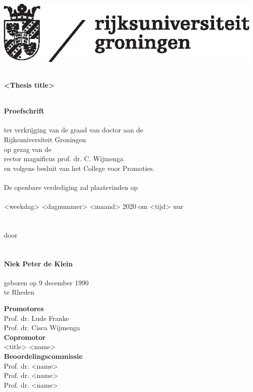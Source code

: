 \begin{flushleft}
\includegraphics[scale=0.8]{img/rugr_logonl_zwart_cmyk}
\end{flushleft}

\begin{center}
\linespread{1.00} %
~\\
\huge
\textbf{<Thesis title>}
\\~\\
\linespread{1.05} %


\large
\textbf{Proefschrift}
\\~\\
\normalsize
ter verkrijging van de graad van doctor aan de\\
Rijksuniversiteit Groningen\\
op gezag van de\\
rector magnificus prof. dr. C. Wijmenga\\
en volgens besluit van het College voor Promoties.
\\~\\
De openbare verdediging zal plaatsvinden op
\\~\\
<weekdag> <dagnummer> <maand> 2020 om <tijd> uur 
\\~\\~\\
door
\\~\\~\\
\large
\textbf{Niek Peter de Klein}
\\~\\
\normalsize
geboren op 9 december 1990\\
te Rheden\\
\normalsize
\end{center}

\clearpage

\noindent
\textbf{Promotores}\\
Prof. dr. Lude Franke\\
Prof. dr. Cisca Wijmenga\\

\noindent
\textbf{Copromotor}\\
<title> <name>\\

\noindent
\textbf{Beoordelingscommissie}\\
Prof. dr. <name>\\
Prof. dr. <name>\\
Prof. dr. <name>\\
